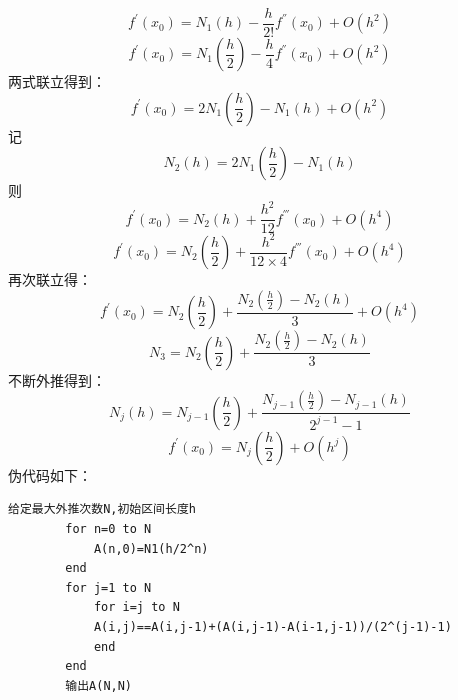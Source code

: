 \documentclass[12pt,a4paper,utf8]{ctexart}
\begin{document}
\begin{enumerate}
		$$f^{'}(x_{0})=N_{1}(h)-\frac{h}{2!}f^{''}(x_{0})+O(h^{2})$$
		$$f^{'}(x_{0})=N_{1}(\frac{h}{2})-\frac{h}{4}f^{''}(x_{0})+O(h^{2})$$
		两式联立得到：
		$$f^{'}(x_{0})=2N_{1}(\frac{h}{2})-N_{1}(h)+O(h^{2})$$
		记$$N_{2}(h)=2N_{1}(\frac{h}{2})-N_{1}(h)$$
		则$$f^{'}(x_{0})=N_{2}(h)+\frac{h^{2}}{12}f^{'''}(x_{0})+O(h^{4})$$
		$$f^{'}(x_{0})=N_{2}(\frac{h}{2})+\frac{h^{2}}{12\times 4}f^{'''}(x_{0})+O(h^{4})$$
		再次联立得：
		$$f^{'}(x_{0})=N_{2}(\frac{h}{2})+\frac{N_{2}(\frac{h}{2})-N_{2}(h)}{3}+O(h^{4})$$
		$$N_{3}=N_{2}(\frac{h}{2})+\frac{N_{2}(\frac{h}{2})-N_{2}(h)}{3}$$
		不断外推得到：
		$$N_{j}(h)=N_{j-1}(\frac{h}{2})+\frac{N_{j-1}(\frac{h}{2})-N_{j-1}(h)}{2^{j-1}-1}$$
		$$f^{'}(x_{0})=N_{j}(\frac{h}{2})+O(h^{j})$$
		伪代码如下：
		\begin{lstlisting}[breaklines,frame=single]
		给定最大外推次数N,初始区间长度h
		for n=0 to N
			A(n,0)=N1(h/2^n)
		end
		for j=1 to N
			for i=j to N
			A(i,j)==A(i,j-1)+(A(i,j-1)-A(i-1,j-1))/(2^(j-1)-1)
			end
		end
		输出A(N,N)
		\end{lstlisting}


\end{enumerate}
\end{document}
